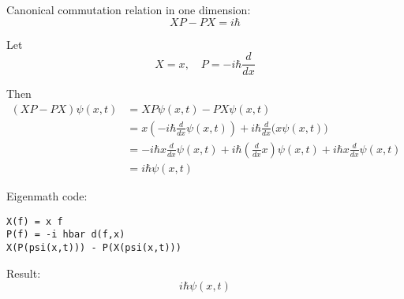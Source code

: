 

\iffalse
Fedak  and Prentis write
\begin{quote}
The theory of Fourier and the correspondence principle of Bohr
played a vital role in Heisenberg's development of quantum mechanics.
\end{quote}

Aitchison, MacManus, and Snyder write
\begin{quote}
This `difficulty’ clearly unsettled Heisenberg: but it very
quickly became clear that the non-commutativity (in general) of kinematical
quantities in quantum theory was the really essential new technical idea in the
paper.
\end{quote}
\fi

Canonical commutation relation in one dimension:
\begin{equation*}
XP-PX=i\hbar
\end{equation*}

Let
\begin{equation*}
X=x,\quad P=-i\hbar\frac{d}{dx}
\end{equation*}

Then
\begin{align*}
(XP-PX)\psi(x,t)&=XP\psi(x,t)-PX\psi(x,t)
\\
&=x\left(-i\hbar\frac{d}{dx}\psi(x,t)\right)+i\hbar\frac{d}{dx}\bigl(x\psi(x,t)\bigr)
\\
&=-i\hbar x\frac{d}{dx}\psi(x,t)+i\hbar\left(\frac{d}{dx}x\right)\psi(x,t)+i\hbar x\frac{d}{dx}\psi(x,t)
\\
&=i\hbar\psi(x,t)
\end{align*}

Eigenmath code:
\begin{verbatim}
X(f) = x f
P(f) = -i hbar d(f,x)
X(P(psi(x,t))) - P(X(psi(x,t)))
\end{verbatim}

Result:
\begin{equation*}
i\hbar\psi(x,t)
\end{equation*}

\iffalse
Commutation relation in three dimensions.
\begin{equation*}
X_1P_1-P_1X_1=i\hbar,\quad
X_2P_2-P_2X_2=i\hbar,\quad
X_3P_3-P_3X_3=i\hbar
\end{equation*}

and
\begin{equation*}
X_jP_k-P_kX_j=0,\quad j\ne k
\end{equation*}
\fi



